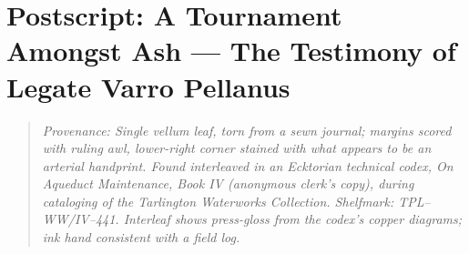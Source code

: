 \documentclass[11pt]{article}
\begin{document}
\clearpage
\section*{Postscript: A Tournament Amongst Ash --- The Testimony of Legate Varro Pellanus}
\label{sec:postscript}
{}

\begin{quote}\footnotesize\itshape
Provenance: Single vellum leaf, torn from a sewn journal; margins scored with ruling awl, lower-right corner stained with what appears to be an arterial handprint. Found interleaved in an Ecktorian technical codex, \emph{On Aqueduct Maintenance, Book IV} (anonymous clerk's copy), during cataloging of the Tarlington Waterworks Collection. Shelfmark: TPL--WW/IV--441. Interleaf shows press-gloss from the codex's copper diagrams; ink hand consistent with a field log.
\end{quote}
\end{document}
